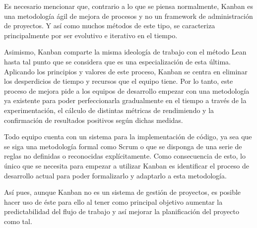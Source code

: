 Es necesario mencionar que, contrario a lo que se piensa normalmente, Kanban es
una metodología ágil de mejora de procesos y no un framework de administración
de proyectos. Y así como muchos métodos de este tipo, se caracteriza
principalmente por ser evolutivo e iterativo en el tiempo.

Asimismo, Kanban comparte la misma ideología de trabajo con el método Lean hasta
tal punto que se considera que es una especialización de esta última. Aplicando
los principios y valores de este proceso, Kanban se centra en eliminar los
desperdicios de tiempo y recursos que el equipo tiene. Por lo tanto, este
proceso de mejora pide a los equipos de desarrollo empezar con una metodología
ya existente para poder perfeccionarla gradualmente en el tiempo a través de la
experimentación, el cálculo de distintas métricas de rendimiendo y la
confirmación de resultados positivos según dichas medidas.

Todo equipo cuenta con un sistema para la implementación de código, ya sea que
se siga una metodología formal como Scrum o que se disponga de una serie de
reglas no definidas o reconocidas explícitamente. Como consecuencia de esto, lo
único que se necesita para empezar a utilizar Kanban es identificar el proceso
de desarrollo actual para poder formalizarlo y adaptarlo a esta metodología.

Así pues, aunque Kanban no es un sistema de gestión de proyectos, es posible
hacer uso de éste para ello al tener como principal objetivo aumentar la
predictabilidad del flujo de trabajo y así mejorar la planificación del proyecto
como tal.


